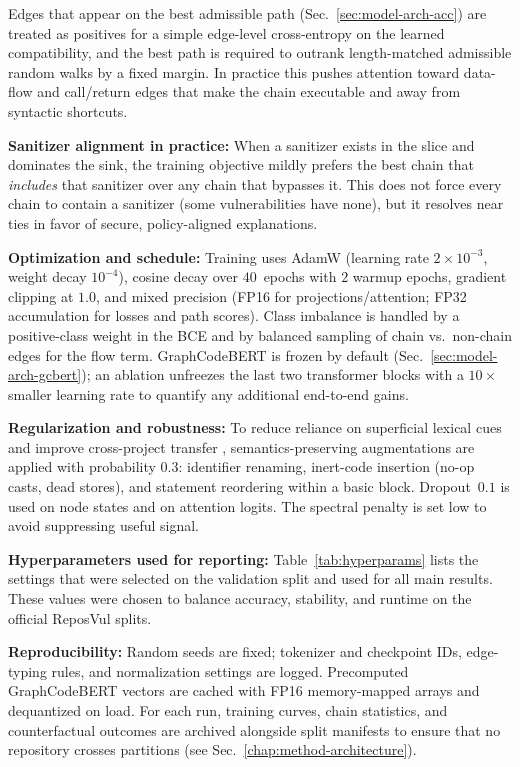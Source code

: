 \documentclass{buthesis}
\begin{document}
Edges that appear on the best admissible path (Sec.~\ref{sec:model-arch-acc}) are treated as positives for a simple edge-level cross-entropy on the learned compatibility, and the best path is required to outrank length-matched admissible random walks by a fixed margin. In practice this pushes attention toward data-flow and call/return edges that make the chain executable and away from syntactic shortcuts.

\textbf{Sanitizer alignment in practice:}
When a sanitizer exists in the slice and dominates the sink, the training objective mildly prefers the best chain that \emph{includes} that sanitizer over any chain that bypasses it. This does not force every chain to contain a sanitizer (some vulnerabilities have none), but it resolves near ties in favor of secure, policy-aligned explanations.

\textbf{Optimization and schedule:}
Training uses AdamW (learning rate $2{\times}10^{-3}$, weight decay $10^{-4}$), cosine decay over $40$~epochs with $2$ warmup epochs, gradient clipping at $1.0$, and mixed precision (FP16 for projections/attention; FP32 accumulation for losses and path scores). Class imbalance is handled by a positive-class weight in the BCE and by balanced sampling of chain vs.\ non-chain edges for the flow term. GraphCodeBERT is frozen by default (Sec.~\ref{sec:model-arch-gcbert}); an ablation unfreezes the last two transformer blocks with a $10\times$ smaller learning rate to quantify any additional end-to-end gains.

\textbf{Regularization and robustness:}
To reduce reliance on superficial lexical cues and improve cross-project transfer \cite{Li2022Empirical,Rahman2024ICSE}, semantics-preserving augmentations are applied with probability $0.3$: identifier renaming, inert-code insertion (no-op casts, dead stores), and statement reordering within a basic block. Dropout~$0.1$ is used on node states and on attention logits. The spectral penalty is set low to avoid suppressing useful signal.

\textbf{Hyperparameters used for reporting:}
Table~\ref{tab:hyperparams} lists the settings that were selected on the validation split and used for all main results. These values were chosen to balance accuracy, stability, and runtime on the official ReposVul splits.

\textbf{Reproducibility:}
Random seeds are fixed; tokenizer and checkpoint IDs, edge-typing rules, and normalization settings are logged. Precomputed GraphCodeBERT vectors are cached with FP16 memory-mapped arrays and dequantized on load. For each run, training curves, chain statistics, and counterfactual outcomes are archived alongside split manifests to ensure that no repository crosses partitions (see Sec.~\ref{chap:method-architecture}).
\end{document}
